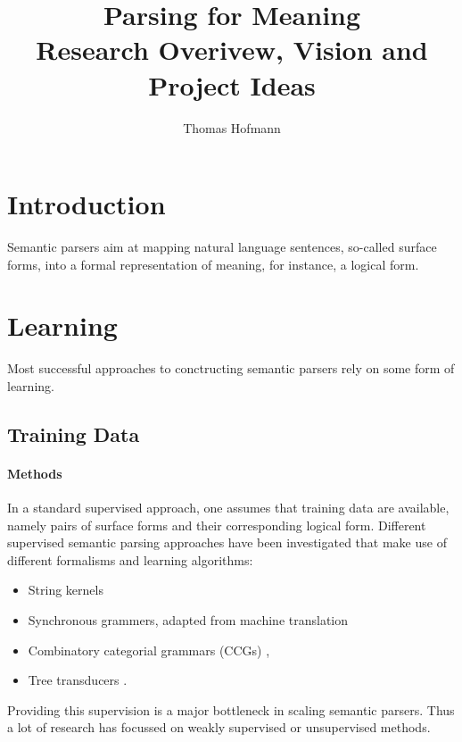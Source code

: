\documentclass{article}
\title{Parsing for Meaning \\ \large Research Overivew, Vision and Project Ideas}
\author{Thomas Hofmann}
\begin{document}
\maketitle 


\section{Introduction}

Semantic parsers aim at mapping natural language sentences, so-called surface forms, into a formal representation of meaning, for instance, a logical form. 


\section{Learning}

Most successful approaches to conctructing semantic parsers rely on some form of learning. 

\subsection{Training Data}

\paragraph{Methods}

In a standard supervised approach, one assumes that training data are available, namely pairs of surface forms and their corresponding logical form. Different supervised semantic parsing approaches have been investigated that make use of different formalisms and learning algorithms:
\begin{itemize}
\item String kernels \cite{Kate2006stringkernels}
\item Synchronous grammers, adapted from machine translation \cite{Wong2007synchronous}
\item Combinatory categorial grammars (CCGs) \cite{Kwiatkowski2010unification}, \cite{Kwiatkowski2011lexical}
\item Tree transducers \cite{Jones2012transducers}. 
\end{itemize}
Providing this supervision is a major bottleneck in scaling semantic
parsers. Thus a lot of research has focussed on weakly supervised or unsupervised methods. 
\end{document}
